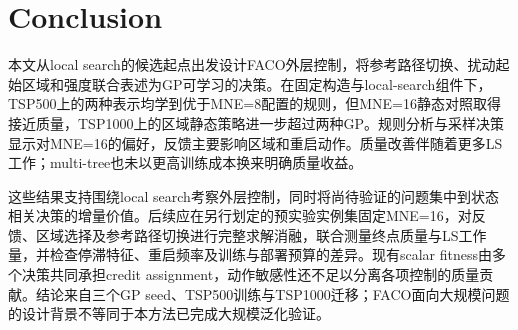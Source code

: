 \section{Conclusion}
本文从local search的候选起点出发设计FACO外层控制，将参考路径切换、扰动起始区域和强度联合表述为GP可学习的决策。在固定构造与local-search组件下，TSP500上的两种表示均学到优于MNE=8配置的规则，但MNE=16静态对照取得接近质量，TSP1000上的区域静态策略进一步超过两种GP。规则分析与采样决策显示对MNE=16的偏好，反馈主要影响区域和重启动作。质量改善伴随着更多LS工作；multi-tree也未以更高训练成本换来明确质量收益。

这些结果支持围绕local search考察外层控制，同时将尚待验证的问题集中到状态相关决策的增量价值。后续应在另行划定的预实验实例集固定MNE=16，对反馈、区域选择及参考路径切换进行完整求解消融，联合测量终点质量与LS工作量，并检查停滞特征、重启频率及训练与部署预算的差异。现有scalar fitness由多个决策共同承担credit assignment，动作敏感性还不足以分离各项控制的质量贡献。结论来自三个GP seed、TSP500训练与TSP1000迁移；FACO面向大规模问题的设计背景不等同于本方法已完成大规模泛化验证。
